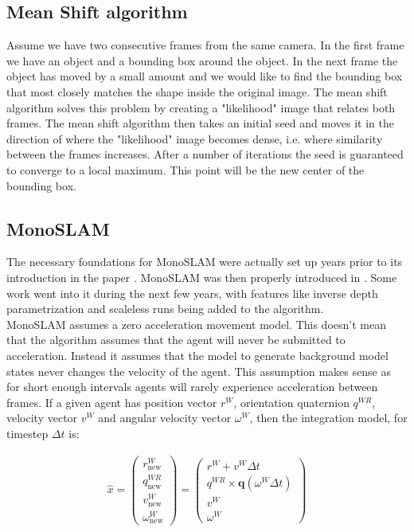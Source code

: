 \documentclass{article}
\begin{document}
\subsection{Mean Shift algorithm}

Assume we have two consecutive frames from the same camera. In the first frame we have an object and a bounding box around the object. In the next frame the object has moved by a small amount and we would like to find the bounding box that most closely matches the shape inside the original image. The mean shift algorithm \cite{Comaniciu2002} solves this problem by creating a "likelihood" image that relates both frames. The mean shift algorithm then takes an initial seed and moves it in the direction of where the "likelihood" image becomes dense, i.e. where similarity between the frames increases. After a number of iterations the seed is guaranteed to converge to a local maximum. This point will be the new center of the bounding box. \\

\subsection{MonoSLAM}

The necessary foundations for MonoSLAM were actually set up years prior to its introduction in the paper \cite{Davison2003}. MonoSLAM was then properly introduced in \cite{Davison2007}. Some work went into it during the next few years, with features like inverse depth parametrization \cite{Civera2008} and scaleless runs being added to the algorithm. \\

MonoSLAM assumes a zero acceleration movement model. This doesn't mean that the algorithm assumes that the agent will never be submitted to acceleration. Instead it assumes that the model to generate background model states never changes the velocity of the agent. This assumption makes sense as for short enough intervals agents will rarely experience acceleration between frames. If a given agent has position vector $r^W$, orientation quaternion $q^{WR}$, velocity vector $v^W$ and angular velocity vector $\omega^W$, then the integration model, for timestep $\Delta t$ is:

\begin{gather*}
\hat{x} =
\begin{pmatrix}
r_\text{new}^W \\
q_\text{new}^{WR} \\
v_\text{new}^W \\
\omega_\text{new}^W
\end{pmatrix}
=
\begin{pmatrix}
r^W + v^W \Delta t \\
q^{WR} \times \mathbf{q}(\omega^W \Delta t) \\
v^W \\
\omega^W
\end{pmatrix} \\
\end{gather*}
\end{document}
